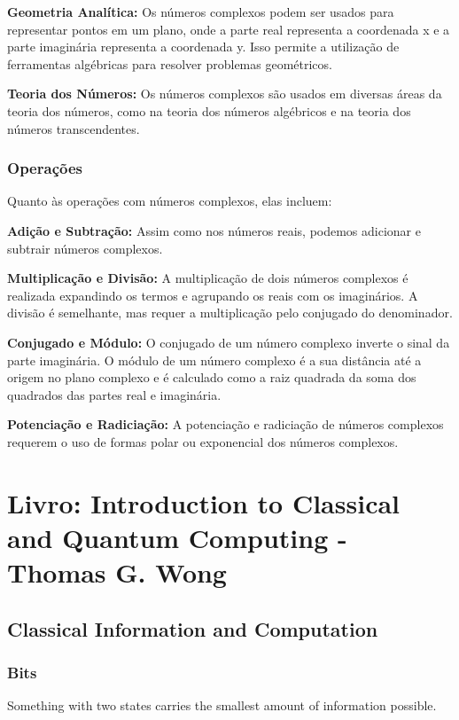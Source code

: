 \documentclass[12pt]{article}
\begin{document}
\textbf{Geometria Analítica:} Os números complexos podem ser usados para representar pontos em um plano, onde a parte real representa a coordenada x e a parte imaginária representa a coordenada y. Isso permite a utilização de ferramentas algébricas para resolver problemas geométricos.

\textbf{Teoria dos Números:} Os números complexos são usados em diversas áreas da teoria dos números, como na teoria dos números algébricos e na teoria dos números transcendentes.

\subsubsection{Operações}

Quanto às operações com números complexos, elas incluem:

\textbf{Adição e Subtração:} Assim como nos números reais, podemos adicionar e subtrair números complexos.

\textbf{Multiplicação e Divisão:} A multiplicação de dois números complexos é realizada expandindo os termos e agrupando os reais com os imaginários. A divisão é semelhante, mas requer a multiplicação pelo conjugado do denominador.

\textbf{Conjugado e Módulo:} O conjugado de um número complexo inverte o sinal da parte imaginária. O módulo de um número complexo é a sua distância até a origem no plano complexo e é calculado como a raiz quadrada da soma dos quadrados das partes real e imaginária.

\textbf{Potenciação e Radiciação:} A potenciação e radiciação de números complexos requerem o uso de formas polar ou exponencial dos números complexos.

\newpage
\section{Livro: Introduction to Classical and Quantum Computing - Thomas G. Wong}

\subsection{Classical Information and Computation}

\subsubsection{Bits}

Something with two states carries the smallest amount of information possible.
\end{document}
